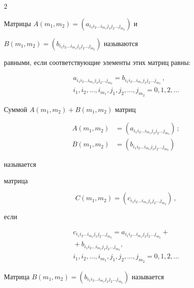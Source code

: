 \begin{multicols}{2}
{Матрицы $A(m_1,m_2) = (a_{i_1 i_2 \dots i_{m_1} j_1 j_2 \dots j_{m_2}})$ и 


$B(m_1,m_2) = (b_{i_1 i_2 \dots i_{m_1} j_1 j_2 \dots j_{m_2}})$ называются 


равными, если соответствующие элементы этих матриц равны:


\begin{multline*}


  a_{i_1 i_2 \dots i_{m_1} j_1 j_2 \dots j_{m_2}} = 


  b_{i_1 i_2 \dots i_{m_1} j_1 j_2 \dots j_{m_2}}\,, \\ 


  i_1,i_2,\dots,i_{m_1},j_1,j_2,\dots,j_{m_2} = 0,1,2,\dots


\end{multline*}





Суммой $A(m_1,m_2) + B(m_1,m_2)$ мат\-риц 


\begin{align*}


A(m_1,m_2) &= (a_{i_1 i_2 \dots i_{m_1} j_1 j_2 \dots j_{m_2}})\,;  \\


B(m_1,m_2) &= (b_{i_1 i_2 \dots i_{m_1} j_1 j_2 \dots j_{m_2}})


\end{align*}


называется 


мат\-ри\-ца 


$$


C(m_1,m_2) = (c_{i_1 i_2 \dots i_{m_1} j_1 j_2 \dots j_{m_2}})\,,$$


если


\begin{multline*}


  c_{i_1 i_2 \dots i_{m_1} j_1 j_2 \dots j_{m_2}} = 


  a_{i_1 i_2 \dots i_{m_1} j_1 j_2 \dots j_{m_2}} +{}\\


  {}+ b_{i_1 i_2 \dots i_{m_1} j_1 j_2 \dots j_{m_2}}, \\


  i_1,i_2,\dots,i_{m_1},j_1,j_2,\dots,j_{m_2} = 0,1,2,\dots


\end{multline*}





Матрица $B(m_1,m_2) = (b_{i_1 i_2 \dots i_{m_1} j_1 j_2 \dots j_{m_2}})$ называется 


}
\end{multicols}
